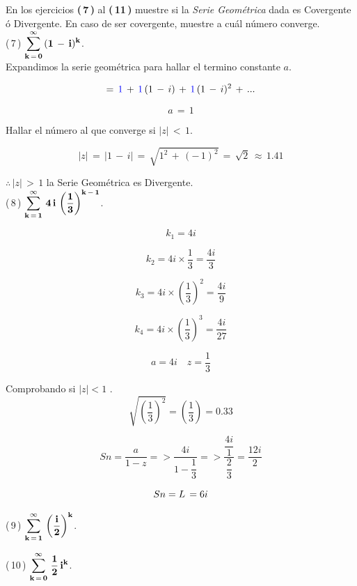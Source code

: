 \documentclass[a4paper,11pt,openany]{book}
\begin{document}
En los ejercicios \textbf{(\,7\,)} al \textbf{(\,11\,)} muestre si la \textcolor{mint}{{\it Serie Geométrica}} dada es Covergente ó Divergente. En caso de ser covergente, muestre a cuál número converge.\\

\textcolor{ao(english)}{(\,7\,)} $\bf{\displaystyle\sum\limits_{k\,=\,0}^{\infty}\,(1\,-\,i)^{k}}$.\\

\textcolor{ao(english)}{} Expandimos la serie geométrica para hallar el termino constante $a$.

$$=\,\textcolor{blue}{1}\,+\,\textcolor{blue}{1}\,(1\,-\,i)\,+\,\textcolor{blue}{1}\,(1\,-\,i)^{2}\,+\,...$$

$$a\,=\,1$$

\textcolor{ao(english)}{} Hallar el número al que converge si $|z|\,<\,1$.

$$|z|\,=\,|1\,-\,i|\,=\,\sqrt{1^{2}\,+\,(-\,1)^{2}}\,=\,\sqrt{2}\,\approx\,1.41$$

$\therefore\,|z|\,>\,1$ la Serie Geométrica es Divergente.\\

\textcolor{ao(english)}{(\,8\,)} $\bf{\displaystyle\sum\limits_{k\,=\,1}^{\infty}\,4\,i\,\left(\dfrac{1}{3}\right)^{k\,-\,1}}$.

$$k_{1}=4i $$

$$k_{2}=4i \times \dfrac{1}{3} = \dfrac{4i}{3}$$

$$k_{3}=4i \times \left(\dfrac{1}{3} \right)^{2} = \dfrac{4i}{9} $$

$$k_{4}=4i \times \left(\dfrac{1}{3} \right)^{3} = \dfrac{4i}{27} $$

$$ a=4i \quad z=\dfrac{1}{3} $$

\providecommand{\abs}[1]{\lvert#1\rvert} 

Comprobando si $\abs{z} < 1$
.\\

$$\sqrt{\left( \dfrac{1}{3} \right)^{2}}= \left( \dfrac{1}{3} \right) = 0.33$$

$$ Sn = \dfrac{a}{1-z} => \dfrac{4i}{1-\dfrac{1}{3}} => \dfrac{\dfrac{4i}{1}}{\dfrac{2}{3}} = \dfrac{12i}{2}$$

$$ Sn = \mathnormal{L}\,= 6i $$

\textcolor{ao(english)}{(\,9\,)} $\bf{\displaystyle\sum\limits_{k\,=\,1}^{\infty}\,\left(\dfrac{i}{2}\right)^{k}}$.

\textcolor{ao(english)}{(\,10\,)} $\bf{\displaystyle\sum\limits_{k\,=\,0}^{\infty}\,\dfrac{1}{2}\,i^{k}}$.
\end{document}
